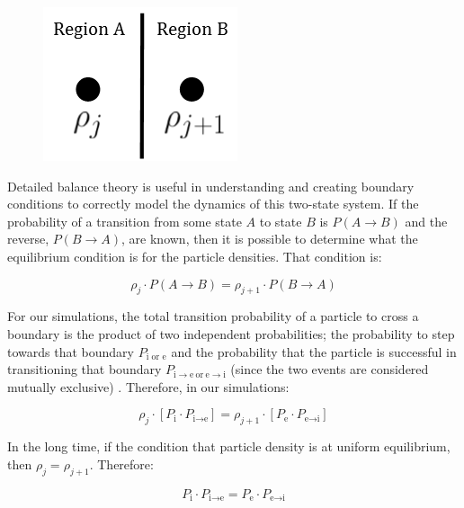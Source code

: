 	\begin{figure}[h]
		\centering
		\includegraphics[width=0.27\linewidth]{../images/balance}
		\caption[Detailed balance theory]{}
		\label{fig:balance}
	\end{figure}
 
	

	Detailed balance theory is useful in understanding and creating boundary conditions to correctly model the dynamics of this two-state system. If the probability of a transition from some state $ A $ to state $ B $ is $ P(A \rightarrow B) $ and the reverse, $ P(B \rightarrow A) $, are known, then it is possible to determine what the equilibrium condition is for the particle densities. That condition is:
	
	\begin{equation}
		\rho_{j} \cdot P(A \rightarrow B) = \rho_{j+1} \cdot P(B \rightarrow A)
	\end{equation}
	
	For our simulations, the total transition probability of a particle to cross a boundary is the product of two independent probabilities; the probability to step towards that boundary $ P_{\textrm{i or e}} $ and the probability that the particle is successful in transitioning that boundary $ P_{\textrm{i} \rightarrow \textrm{e} \: \textrm{or} \: \textrm{e} \rightarrow \textrm{i}} $ (since the two events are considered mutually exclusive) \citep{haan}. Therefore, in our simulations:
	
	\begin{equation}
		\rho_{j} \cdot \left[ P_{\textrm{i}} \cdot P_{\textrm{i} \rightarrow \textrm{e}} \right] = \rho_{j+1} \cdot \left[  P_{\textrm{e}} \cdot P_{\textrm{e} \rightarrow \textrm{i}} \right] 
	\end{equation}
	
	In the long time, if the condition that particle density is at uniform equilibrium, then  $\rho_{j} = \rho_{j+1} $. Therefore:
	
	\begin{equation}
		P_{\textrm{i}} \cdot P_{\textrm{i} \rightarrow \textrm{e}} = P_{\textrm{e}} \cdot P_{\textrm{e} \rightarrow \textrm{i}}
	\end{equation}
	
